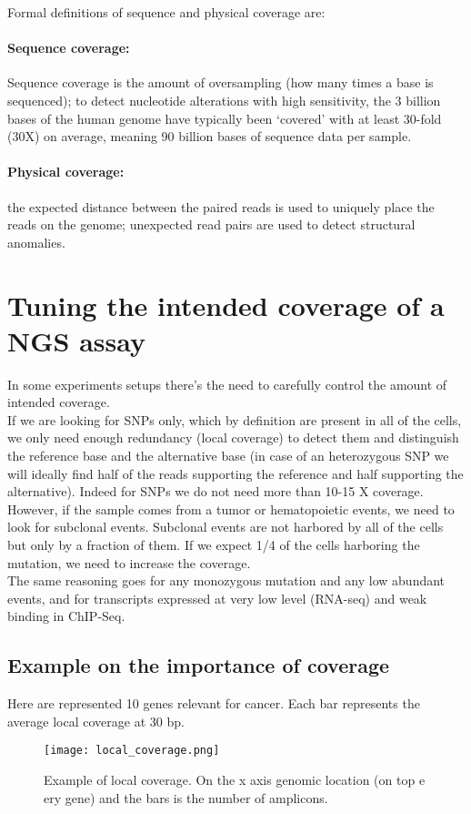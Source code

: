 Formal definitions of sequence and physical coverage are:

\paragraph*{Sequence coverage:}
	Sequence coverage is the amount of oversampling (how many times a base is sequenced); to detect nucleotide alterations with high sensitivity, the 3 billion bases of the human genome have typically been ‘covered’ with at least 30-fold (30X) on average, meaning 90 billion bases of sequence data per sample.
	\paragraph*{Physical coverage:}
		the expected distance between the paired reads is used to uniquely place the reads on the genome; unexpected read pairs are used to detect structural anomalies.



\section{Tuning the intended coverage of a NGS assay}
In some experiments setups there's the need to carefully control the amount of intended coverage. \\
If we are looking for SNPs only, which by definition are present in all of the cells, we only need enough redundancy (local coverage) to detect them and distinguish the reference base and the alternative base (in case of an heterozygous SNP we will ideally find half of the reads supporting the reference and half supporting the alternative). Indeed for SNPs we do not need more than 10-15 X coverage.
\\
However, if the sample comes from a tumor or hematopoietic events, we need to look for subclonal events. Subclonal events are not harbored by all of the cells but only by a fraction of them. If we expect 1/4 of the cells harboring the mutation, we need to increase the coverage. \\
The same reasoning goes for any monozygous mutation and any low abundant events, and for  transcripts expressed at very low level (RNA-seq) and weak binding in ChIP-Seq.

\subsection{Example on the importance of coverage}
Here are represented 10 genes relevant for cancer. Each bar represents the average local coverage at 30 bp.
\begin{figure}[H]
    \centering
    \texttt{[image: local\_coverage.png]}
    \caption{Example of local coverage. On the x axis genomic location (on top e ery gene) and the bars is the number of amplicons. }
    \label{fig:local}
\end{figure}

